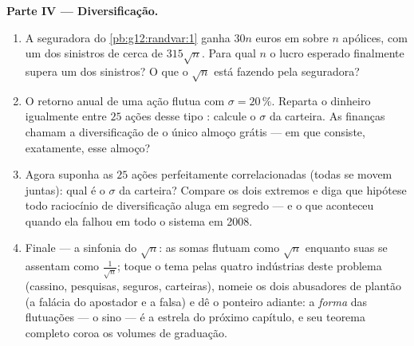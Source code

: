 \begin{problem}
\medskip
\noindent\textbf{Parte IV --- Diversificação.}
\begin{enumerate}[resume]
  \item A seguradora do \cref{pb:g12:randvar:1} ganha
        $30n$ euros em  sobre $n$ apólices, com um
         dos sinistros de cerca de $315\sqrt n$.
        Para qual $n$ o lucro esperado finalmente supera um
         dos sinistros? O que o $\sqrt n$ está
        fazendo pela seguradora?
  \item O retorno anual de uma ação flutua com
        $\sigma = 20\,\%$. Reparta o dinheiro igualmente entre
        $25$ ações desse tipo \emph{}: calcule o
        $\sigma$ da carteira. As finanças chamam a
        diversificação de o único almoço grátis --- em que
        consiste, exatamente, esse almoço?
  \item Agora suponha as $25$ ações perfeitamente
        correlacionadas (todas se movem juntas): qual é o
        $\sigma$ da carteira? Compare os dois extremos e diga
        que hipótese todo raciocínio de diversificação aluga em
        segredo --- e o que aconteceu quando ela falhou em todo
        o sistema em 2008.
  \item Finale --- a sinfonia do $\sqrt n$: as somas flutuam
        como $\sqrt n$ enquanto suas  se assentam como
        $\frac{1}{\sqrt n}$; toque o tema pelas quatro
        indústrias deste problema (cassino, pesquisas, seguros,
        carteiras), nomeie os dois abusadores de plantão (a
        falácia do apostador e a  falsa) e dê o
        ponteiro adiante: a \emph{forma} das flutuações --- o
        sino --- é a estrela  do próximo capítulo, e
        seu teorema completo coroa os volumes de graduação.
\end{enumerate}
\end{problem}
